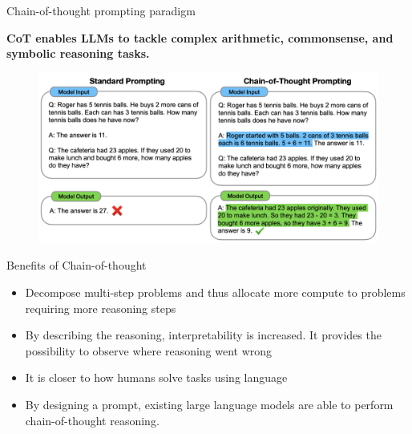 
\begin{vbframe}{Chain-of-thought prompting paradigm}

\vfill

\textbf{CoT enables LLMs to tackle complex arithmetic, commonsense, and symbolic reasoning tasks.}

\begin{figure}
    \centering
    \includegraphics{figure/chain_of_thought.png}\\
\end{figure}

\vfill

\end{vbframe}



\begin{vbframe}{Benefits of Chain-of-thought}

\vfill

\begin{itemize}
    \item Decompose multi-step problems and thus allocate more compute to problems requiring more reasoning steps
    \item By describing the reasoning, interpretability is increased. It provides the possibility to observe where reasoning went wrong
    \item It is closer to how humans solve tasks using language
    \item By designing a prompt, existing large language models are able to perform chain-of-thought reasoning.
\end{itemize}

\vfill

\end{vbframe}


